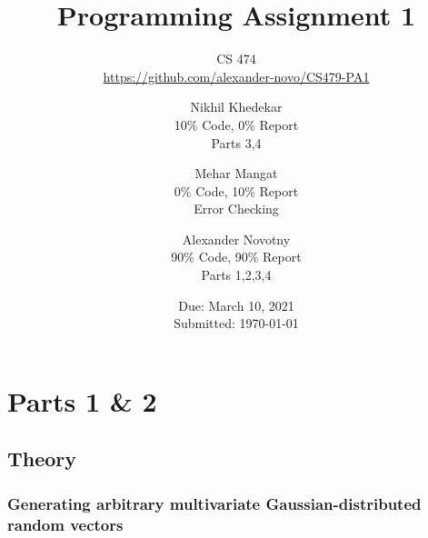 \documentclass[headings=optiontoheadandtoc,listof=totoc,parskip=full]{scrartcl}
\title{Programming Assignment 1}
\subtitle{CS 474\\\url{https://github.com/alexander-novo/CS479-PA1}}
\author{Nikhil Khedekar\\10\% Code, 0\% Report\\ Parts 3,4 \and Mehar Mangat\\0\% Code,  10\% Report\\ Error Checking  \and Alexander Novotny\\90\% Code, 90\% Report\\ Parts 1,2,3,4}
\date{Due: March 10, 2021 \\ Submitted: \today}
\begin{document}
\maketitle
\tableofcontents
{}

\newpage
{}

\section{Parts 1 \& 2}
\label{sec:part-1}

\subsection{Theory}

\subsubsection{Generating arbitrary multivariate Gaussian-distributed random vectors}
\end{document}
